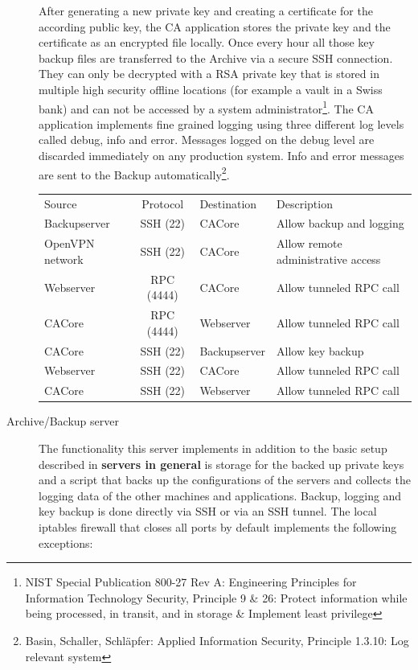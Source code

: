 \documentclass[a4paper, toc=index, 12pt, DIV14, twoside, BCOR2cm, headsepline, numbers=noenddot, bibliography=totoc]{report}
\begin{document}
\begin{description}
After generating a new private key and creating a certificate for the according public key, the CA application stores the private key and the certificate as an encrypted file locally. Once every hour all those key backup files are transferred to the Archive via a secure SSH connection. They can only be decrypted with a RSA private key that is stored in multiple high security offline locations (for example a vault in a Swiss bank) and can not be accessed by a system administrator\footnote{NIST Special Publication 800-27 Rev A: Engineering Principles for Information Technology Security, Principle 9 \& 26: Protect information while being processed, in transit, and in storage \& Implement least privilege}.\newline
The CA application implements fine grained logging using three different log levels called debug, info and error. Messages logged on the debug level are discarded immediately on any production system. Info and error messages are sent to the Backup automatically\footnote{Basin, Schaller, Schläpfer: Applied Information Security, Principle 1.3.10: Log relevant system}.

\begin{tabular}{p{2.5cm} c l p{4.5cm}}
Source & Protocol & Destination & Description\\
\cline{1-4}
Backupserver & SSH (22) & CACore & Allow backup and logging\\
\cline{1-4}
OpenVPN network & SSH (22) & CACore & Allow remote administrative access  \\
\cline{1-4}
Webserver & RPC (4444) & CACore & Allow tunneled RPC call \\
\cline{1-4}
CACore & RPC (4444) & Webserver & Allow tunneled RPC call \\
\cline{1-4}
CACore & SSH (22) & Backupserver & Allow key backup \\
\cline{1-4}
Webserver & SSH (22) & CACore & Allow tunneled RPC call \\
\cline{1-4}
CACore & SSH (22) & Webserver & Allow tunneled RPC call \\
\end{tabular}


\item[Archive/Backup server ] The functionality this server implements in addition to the basic setup described in {\bfseries servers in general} is storage for the backed up private keys and a script that backs up the configurations of the servers and collects the logging data of the other machines and applications. Backup, logging and key backup is done directly via SSH or via an SSH tunnel.\newline
The local iptables firewall that closes all ports by default implements the following exceptions:


\end{description}
\end{document}
